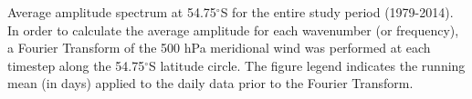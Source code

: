 \label{fig:fourier_spectrum}
Average amplitude spectrum at 54.75$^{\circ}$S for the entire study period (1979-2014). In order to calculate the average amplitude for each wavenumber (or frequency), a Fourier Transform of the 500 hPa meridional wind was performed at each timestep along the 54.75$^{\circ}$S latitude circle. The figure legend indicates the running mean (in days) applied to the daily data prior to the Fourier Transform. 